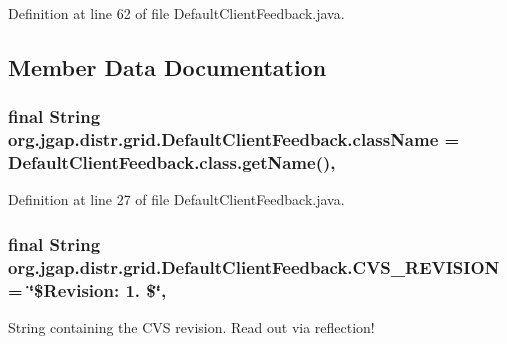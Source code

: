 Definition at line 62 of file Default\-Client\-Feedback.\-java.



\subsection{Member Data Documentation}
\hypertarget{classorg_1_1jgap_1_1distr_1_1grid_1_1_default_client_feedback_a11014e591bed3d694db329fd7212410d}{
\subsubsection[{class\-Name}]{\setlength{\rightskip}{0pt plus 5cm}final String org.\-jgap.\-distr.\-grid.\-Default\-Client\-Feedback.\-class\-Name = Default\-Client\-Feedback.\-class.\-get\-Name()\hspace{0.3cm}{\ttfamily [static]}, {\ttfamily [private]}}}\label{classorg_1_1jgap_1_1distr_1_1grid_1_1_default_client_feedback_a11014e591bed3d694db329fd7212410d}


Definition at line 27 of file Default\-Client\-Feedback.\-java.

\hypertarget{classorg_1_1jgap_1_1distr_1_1grid_1_1_default_client_feedback_af55832416d54f1994b28789bd1301a02}{
\subsubsection[{C\-V\-S\-\_\-\-R\-E\-V\-I\-S\-I\-O\-N}]{\setlength{\rightskip}{0pt plus 5cm}final String org.\-jgap.\-distr.\-grid.\-Default\-Client\-Feedback.\-C\-V\-S\-\_\-\-R\-E\-V\-I\-S\-I\-O\-N = \char`\"{}\$Revision\-: 1. \$\char`\"{}\hspace{0.3cm}{\ttfamily [static]}, {\ttfamily [private]}}}\label{classorg_1_1jgap_1_1distr_1_1grid_1_1_default_client_feedback_af55832416d54f1994b28789bd1301a02}
String containing the C\-V\-S revision. Read out via reflection! 

